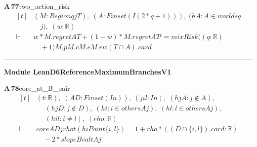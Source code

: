 \documentclass[conference]{IEEEtran}
\theoremstyle{definition}
\newcommand{\lean}[1]{\textsf{\footnotesize #1}}
\begin{document}
\noindent\textbf{A\,77}\quad\lean{two\_action\_risk}
{\footnotesize\[ \begin{aligned}[t]
&(\mathit{M} : \mathit{Region} \mathit{q} \mathit{j} \mathit{T}),\; (\mathit{A} : \mathit{Finset} (\mathit{I} (2*\mathit{q}+1))),\; (\mathit{hA} : \mathit{A} \in \mathit{worlds} \mathit{q}\\
&\quad \mathit{j}),\; (\mathit{w} : \mathbb{R} )\\
\vdash\;&\mathit{w}*\mathit{M}.\mathit{regret} \mathit{A} \mathit{T}+(1-\mathit{w})*\mathit{M}.\mathit{regret} \mathit{A} \mathit{Tᶜ} = \mathit{mixRisk} ((\mathit{q}:\mathbb{R} )\\
&\quad +1) \mathit{M}.\mathit{p} \mathit{M}.\mathit{c} \mathit{M}.\mathit{e} \mathit{M}.\mathit{r} \mathit{w} (\mathit{T} \cap \mathit{A}).\mathit{card}
\end{aligned} \]}

\vspace{4pt}\noindent\rule{\columnwidth}{0.4pt}\par\vspace{2pt}
\noindent\textbf{Module \lean{LeanD6ReferenceMaximumBranchesV1}}\par\vspace{3pt}

\noindent\textbf{A\,78}\quad\lean{core\_at\_B\_pair}
{\footnotesize\[ \begin{aligned}[t]
&(\mathit{t} : \mathbb{R} ),\; (\mathit{A} \mathit{D} : \mathit{Finset} (\mathit{I} \mathit{n})),\; (\mathit{j} \mathit{i} \mathit{l} : \mathit{I} \mathit{n}),\; (\mathit{hjA} : \mathit{j} \notin \mathit{A}),\\
&\quad \; (\mathit{hjD} : \mathit{j} \notin \mathit{D}),\; (\mathit{hi} : \mathit{i} \in \mathit{others} \mathit{A} \mathit{j}),\; (\mathit{hl} : \mathit{l} \in \mathit{others} \mathit{A} \mathit{j}),\\
&\quad \; (\mathit{hil} : \mathit{i} \neq \mathit{l}),\; (\mathit{rho} : \mathbb{R} )\\
\vdash\;&\mathit{core} \mathit{A} \mathit{D} \mathit{j} \mathit{rho} \mathit{t} (\mathit{hiPoint} \{ \mathit{i},\mathit{l}\} ) = 1+\mathit{rho}*((\mathit{D} \cap \{ \mathit{i},\mathit{l}\} ).\mathit{card}:\mathbb{R} )\\
&\quad -2*\mathit{slopeBval} \mathit{t} \mathit{A} \mathit{j}
\end{aligned} \]}
\end{document}
